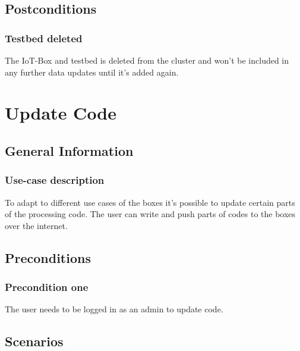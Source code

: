 \documentclass[notitlepage]{article}
\begin{document}
\subsection{Postconditions}

\subsubsection{Testbed deleted}
The IoT-Box and testbed is deleted from the cluster and won't be included in any further data updates until it's added again.

\section{Update Code}

\subsection{General Information}
\subsubsection{Use-case description}

To adapt to different use cases of the boxes it's possible to update certain parts of the processing code. The user can write and push parts of codes to the boxes over the internet.

\subsection{Preconditions}

\subsubsection{Precondition one}
The user needs to be logged in as an admin to update code.

\subsection{Scenarios}
\end{document}
